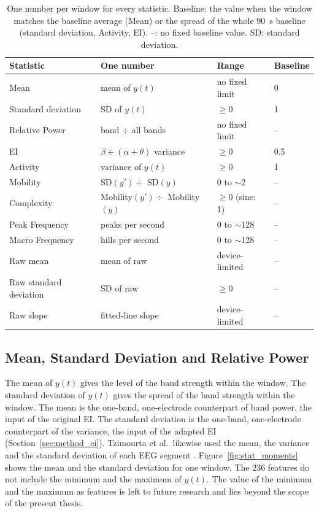 \documentclass[12pt,a4paper]{report}
\begin{document}
\begin{table}[H]
\centering
\footnotesize
\begin{tabular}{llll}
\toprule
\textbf{Statistic} & \textbf{One number} & \textbf{Range} & \textbf{Baseline} \\
\midrule
Mean & mean of \(y(t)\) & no fixed limit & 0 \\
Standard deviation & SD of \(y(t)\) & \(\geq 0\) & 1 \\
Relative Power & band \(\div\) all bands & no fixed limit & -- \\
EI & \(\beta \div (\alpha + \theta)\) variance & \(\geq 0\) & 0.5 \\
Activity & variance of \(y(t)\) & \(\geq 0\) & 1 \\
Mobility & SD\((y') \div\) SD\((y)\) & 0 to \(\sim\)2 & -- \\
Complexity & Mobility\((y') \div\) Mobility\((y)\) & \(\geq 0\) (sine: 1) & -- \\
Peak Frequency & peaks per second & 0 to \(\sim\)128 & -- \\
Macro Frequency & hills per second & 0 to \(\sim\)128 & -- \\
Raw mean & mean of raw & device-limited & -- \\
Raw standard deviation & SD of raw & \(\geq 0\) & -- \\
Raw slope & fitted-line slope & device-limited & -- \\
\bottomrule
\end{tabular}
\caption[One number per window for every statistic]{One number per window for every statistic. Baseline: the value when the window matches the baseline average (Mean) or the spread of the whole 90~s baseline (standard deviation, Activity, EI). --: no fixed baseline value. SD: standard deviation.}
\label{tab:feature_ranges}
\end{table}

\subsection{Mean, Standard Deviation and Relative Power}
The mean of \(y(t)\) gives the level of the band strength within the window. The standard deviation of \(y(t)\) gives the spread of the band strength within the window. The mean is the one-band, one-electrode counterpart of band power, the input of the original EI. The standard deviation is the one-band, one-electrode counterpart of the variance, the input of the adapted EI (Section~\ref{sec:method_ei}). Tzimourta et al.\ likewise used the mean, the variance and the standard deviation of each EEG segment \cite{tzimourta_eeg_2019}. Figure~\ref{fig:stat_moments} shows the mean and the standard deviation for one window. The 236 features do not include the minimum and the maximum of \(y(t)\). The value of the minimum and the maximum as features is left to future research and lies beyond the scope of the present thesis.
\end{document}
